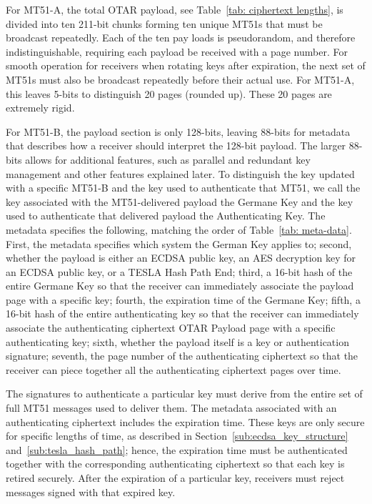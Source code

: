 \documentclass[letterpaper,times]{IONconf/IONconf}
\begin{document}
		For MT51-A, the total OTAR payload, see Table~\ref{tab: ciphertext lengths}, is divided into ten 211-bit chunks forming ten unique MT51s that must be broadcast repeatedly.
		Each of the ten pay loads is pseudorandom, and therefore indistinguishable, requiring each payload be received with a page number.
		For smooth operation for receivers when rotating keys after expiration, the next set of MT51s must also be broadcast repeatedly before their actual use.
		For MT51-A, this leaves 5-bits to distinguish 20 pages (rounded up).
		These 20 pages are extremely rigid.
		
		For MT51-B, the payload section is only 128-bits, leaving 88-bits for metadata that describes how a receiver should interpret the 128-bit payload.
		The larger 88-bits allows for additional features, such as parallel and redundant key management and other features explained later.
		To distinguish the key updated with a specific MT51-B and the key used to authenticate that MT51, we call the key associated with the MT51-delivered payload the Germane Key and the key used to authenticate that delivered payload the Authenticating Key.
		The metadata specifies the following, matching the order of Table~\ref{tab: meta-data}.
		First, the metadata specifies which system the German Key applies to;
		second, whether the payload is either an ECDSA public key, an AES decryption key for an ECDSA public key, or a TESLA Hash Path End;
		third, a 16-bit hash of the entire Germane Key so that the receiver can immediately associate the payload page with a specific key;
		fourth, the expiration time of the Germane Key;
		fifth, a 16-bit hash of the entire authenticating key so that the receiver can immediately associate the authenticating ciphertext OTAR Payload page with a specific authenticating key;
		sixth, whether the payload itself is a key or authentication signature;
		seventh, the page number of the authenticating ciphertext so that the receiver can piece together all the authenticating ciphertext pages over time.

		The signatures to authenticate a particular key must derive from the entire set of full MT51 messages used to deliver them.
		The metadata associated with an authenticating ciphertext includes the expiration time.
		These keys are only secure for specific lengths of time, as described in Section~\ref{sub:ecdsa_key_structure} and~\ref{sub:tesla_hash_path}; hence, the expiration time must be authenticated together with the corresponding authenticating ciphertext so that each key is retired securely.
		After the expiration of a particular key, receivers must reject messages signed with that expired key.
\end{document}
